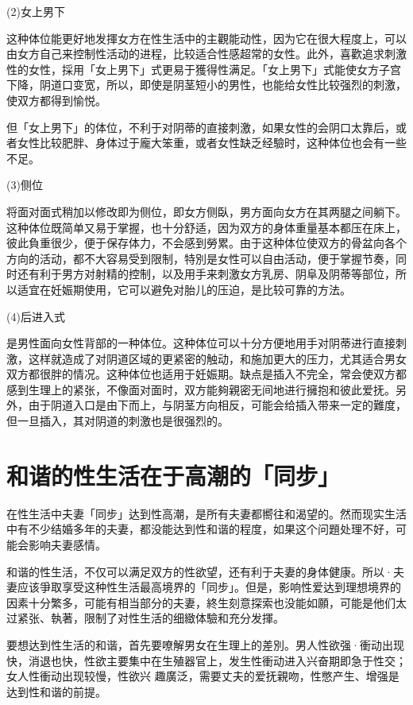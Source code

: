 \documentclass[12pt,UTF8]{ctexbook}
\begin{document}
(2)女上男下

这种体位能更好地发揮女方在性生活中的主觀能动性，因为它在很大程度上，可以由女方自己来控制性活动的进程，比较适合性感超常的女性。此外，喜歡追求刺激性的女性，採用「女上男下」式更易于獲得性满足。「女上男下」式能使女方子宫下降，阴道口变宽，所以，即使是阴茎短小的男性，也能给女性比较强烈的刺激，使双方都得到愉悦。

但「女上男下」的体位，不利于对阴蒂的直接刺激，如果女性的会阴口太靠后，或者女性比较肥胖、身体过于龐大笨重，或者女性缺乏经驗时，这种体位也会有一些不足。

(3)侧位

将面对面式稍加以修改即为侧位，即女方侧臥，男方面向女方在其两腿之间躺下。这种体位既简单又易于掌握，也十分舒适，因为双方的身体重量基本都压在床上，彼此負重很少，便于保存体力，不会感到勞累。由于这种体位使双方的骨盆向各个方向的活动，都不大容易受到限制，特別是女性可以自由活动，便于掌握节奏，同时还有利于男方对射精的控制，以及用手来刺激女方乳房、阴阜及阴蒂等部位，所以适宜在妊娠期使用，它可以避免对胎儿的压迫，是比较可靠的方法。

(4)后进入式

是男性面向女性背部的一种体位。这种体位可以十分方便地用手对阴蒂进行直接刺激，这样就造成了对阴道区域的更紧密的触动，和施加更大的压力，尤其适合男女双方都很胖的情况。这种体位也适用于妊娠期。缺点是插入不完全，常会使双方都感到生理上的紧张，不像面对面时，双方能夠親密无间地进行擁抱和彼此爱抚。另外，由于阴道入口是由下而上，与阴茎方向相反，可能会给插入带来一定的難度，但一旦插入，其对阴道的刺激也是很强烈的。

\section{和谐的性生活在于高潮的「同步」}

在性生活中夫妻「同步」达到性高潮，是所有夫妻都嚮往和渴望的。然而现实生活中有不少结婚多年的夫妻，都没能达到性和谐的程度，如果这个问題处理不好，可能会影响夫妻感情。

和谐的性生活，不仅可以满足双方的性欲望，还有利于夫妻的身体健康。所以·夫妻应该爭取享受这种性生活最高境界的「同步」。但是，影响性爱达到理想境界的因素十分繁多，可能有相当部分的夫妻，終生刻意探索也没能如願，可能是他们太过紧张、執著，限制了对性生活的细緻体驗和充分发揮。

要想达到性生活的和谐，首先要嘹解男女在生理上的差別。男人性欲强·衝动出现快，消退也快，性欲主要集中在生殖器官上，发生性衝动进入兴奋期即急于性交；女人性衝动出现较慢，性欲兴
趣廣泛，需要丈夫的爱抚親吻，性憋产生、增强是达到性和谐的前提。
\end{document}

